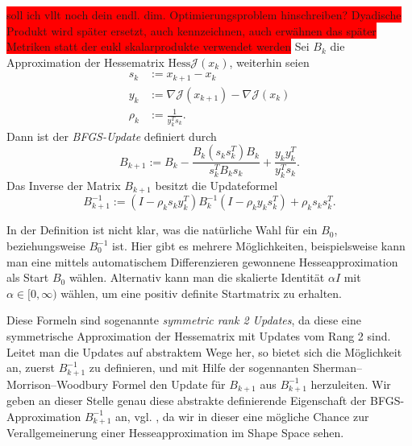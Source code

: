 \begin{defi}\label{BFGS-updates}
	\colorbox{red}{soll ich vllt noch dein endl. dim. Optimierungsproblem hinschreiben? Dyadische Produkt wird später ersetzt, auch kennzeichnen, auch erwähnen das später Metriken statt der eukl skalarprodukte verwendet werden}	
	Sei $B_k$ die Approximation der Hessematrix $\text{Hess}\mathcal{J}(x_k)$, weiterhin seien 
	\begin{align*}
		s_k &:= x_{k+1} - x_k \\ y_k &:= \nabla \mathcal{J}(x_{k+1}) - \nabla \mathcal{J}(x_k) \\ \rho_k &:= \frac{1}{y_k^T s_k }.
	\end{align*}
	Dann ist der \textit{BFGS-Update} definiert durch
	\begin{equation}
		B_{k+1} := B_k - \frac{B_k (s_k s_k^T) B_k}{s_k^T B_k s_k} + \frac{y_k y_k^T}{y_k^T s_k}.
	\end{equation}
	Das Inverse der Matrix $B_{k+1}$ besitzt die Updateformel
	\begin{equation}
		B_{k+1}^{-1} := (I - \rho_k s_k y_k^T)B_k^{-1}(I - \rho_k y_k s_k^T) + \rho_k s_k s_k^T.
	\end{equation}
\end{defi}
In der Definition ist nicht klar, was die natürliche Wahl für ein $B_0$, beziehungsweise $B_0^{-1}$ ist. Hier gibt es mehrere Möglichkeiten, beispielsweise kann man eine mittels automatischem Differenzieren gewonnene Hesseapproximation als Start $B_0$ wählen. Alternativ kann man die skalierte Identität $\alpha I$ mit $\alpha \in [0,\infty)$ wählen, um eine positiv definite Startmatrix zu erhalten.

Diese Formeln sind sogenannte \textit{symmetric rank 2 Updates}, da diese eine symmetrische Approximation der Hessematrix mit Updates vom Rang 2 sind. Leitet man die Updates auf abstraktem Wege her, so bietet sich die Möglichkeit an, zuerst $B_{k+1}^{-1}$ zu definieren, und mit Hilfe der sogennanten Sherman–
Morrison–Woodbury Formel den Update für $B_{k+1}$ aus $B_{k+1}^{-1}$ herzuleiten. Wir geben an dieser Stelle genau diese abstrakte definierende Eigenschaft der BFGS-Approximation $B_{k+1}^{-1}$ an, vgl. \cite{Nocedal}, da wir in dieser eine mögliche Chance zur Verallgemeinerung einer Hesseapproximation im Shape Space sehen.

